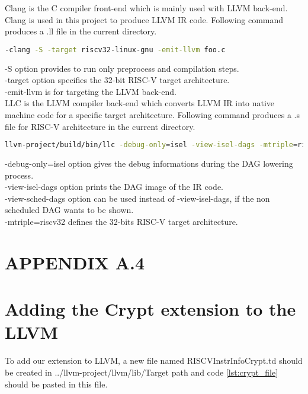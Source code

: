 Clang is the C compiler front-end which is mainly used with LLVM back-end. Clang is used in this project to produce LLVM IR code. Following command produces a .ll file in the current directory. 

\begin{lstlisting}[language=Bash]
-clang -S -target riscv32-linux-gnu -emit-llvm foo.c
\end{lstlisting}

-S option provides to run only preprocess and compilation steps. \\
-target option specifies the 32-bit RISC-V target architecture. \\
-emit-llvm is for targeting the LLVM back-end. \\

LLC is the LLVM compiler back-end which converts LLVM IR into native machine code for a specific target architecture. Following command produces a .s file for RISC-V architecture in the current directory. 

\begin{lstlisting}[language=Bash]
llvm-project/build/bin/llc -debug-only=isel -view-isel-dags -mtriple=riscv32 lxr.ll
\end{lstlisting}

-debug-only=isel option gives the debug informations during the DAG lowering process.\\
-view-isel-dags option prints the DAG image of the IR code.\\
-view-sched-dags option can be used instead of -view-isel-dags, if the non scheduled DAG wants to be shown.\\
-mtriple=riscv32 defines the 32-bits RISC-V target architecture.\\
\newpage



\section*{APPENDIX A.4}
\renewcommand{\theequation}{A.2.\arabic{equation}}
\setcounter{equation}{0}
\section{Adding the Crypt extension to the LLVM}
To add our extension to LLVM, a new file named RISCVInstrInfoCrypt.td should be created in ../llvm-project/llvm/lib/Target path and code \ref{lst:crypt_file} should be pasted in this file.

